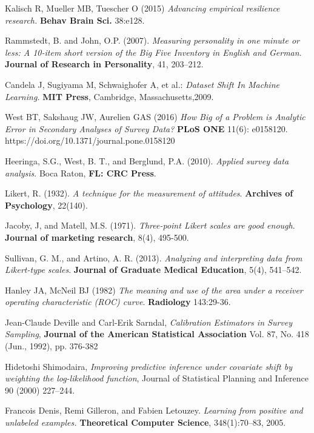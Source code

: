 \begin{thebibliography}{9}

Kalisch R, Mueller MB, Tuescher O (2015) \textit{Advancing empirical resilience research.} \textbf{Behav Brain Sci.} 38:e128.

Rammstedt, B. and John, O.P. (2007). \textit{Measuring personality in one minute or less: A 10-item short version of  the Big Five Inventory in English and German}. \textbf{Journal of Research in Personality}, 41, 203–212. 

Candela J, Sugiyama M, Schwaighofer A, et al.: \textit{Dataset Shift In Machine Learning.} \textbf{MIT Press}, Cambridge, Massachusetts,2009.

West BT, Sakshaug JW, Aurelien GAS (2016) \textit{How Big of a Problem is Analytic Error in Secondary Analyses of Survey Data?} \textbf{PLoS ONE} 11(6): e0158120. https://doi.org/10.1371/journal.pone.0158120

Heeringa, S.G., West, B. T., and Berglund, P.A. (2010). \textit{Applied survey data analysis}. Boca Raton, \textbf{FL: CRC Press}.

Likert, R. (1932). \textit{A technique for the measurement of attitudes}. \textbf{Archives of Psychology}, 22(140).

Jacoby, J, and Matell, M.S. (1971). \textit{Three-point Likert scales are good enough}. \textbf{Journal of marketing research}, 8(4), 495-500.

Sullivan, G. M., and Artino, A. R. (2013). \textit{Analyzing and interpreting data from Likert-type scales}. \textbf{Journal of Graduate Medical Education}, 5(4), 541–542. 

Hanley JA, McNeil BJ (1982) \textit{The meaning and use of the area under a receiver operating characteristic (ROC) curve}. \textbf{Radiology} 143:29-36. 

Jean-Claude Deville and Carl-Erik Sarndal, \textit{Calibration Estimators in Survey Sampling}, \textbf{Journal of the American Statistical Association}
Vol. 87, No. 418 (Jun., 1992), pp. 376-382

Hidetoshi Shimodaira, \textit{Improving predictive inference under covariate shift by weighting the log-likelihood function}, Journal of Statistical Planning and Inference 90 (2000) 227–244.

 Francois Denis, Remi Gilleron, and Fabien Letouzey. \textit{Learning from positive and unlabeled examples.} \textbf{Theoretical Computer Science}, 348(1):70–83, 2005. 


\end{thebibliography}
